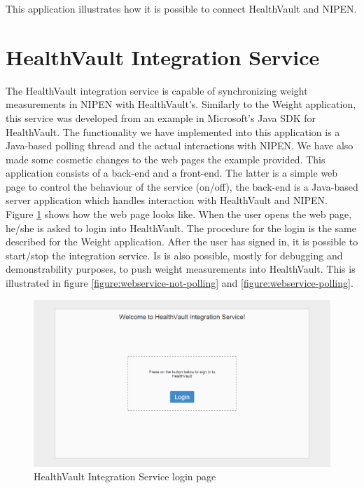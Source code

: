 This application illustrates how it is possible to connect HealthVault and NIPEN.

\section{HealthVault Integration Service}

The HealthVault integration service is capable of synchronizing weight measurements in NIPEN with HealthVault's.
Similarly to the Weight application, this service was developed from an example in Microsoft's Java SDK for HealthVault.
The functionality we have implemented into this application is a Java-based polling thread and the actual
interactions with NIPEN. We have also made some cosmetic changes to the web pages the example provided.
This application consists of a back-end and a front-end. The latter is a simple web page to control
the behaviour of the service (on/off), the back-end is a Java-based server application which handles
interaction with HealthVault and NIPEN.
Figure \ref{figure:webservice-login} shows how the web page looks like.
When the user opens the web page, he/she is asked to login into HealthVault.
The procedure for the login is the same described for the Weight application.
After the user has signed in, it is possible to start/stop the integration service.
Is is also possible, mostly for debugging and demonstrability purposes, to push weight measurements into HealthVault. 
This is illustrated in figure \ref{figure:webservice-not-polling} and \ref{figure:webservice-polling}.

\begin{figure}[H]
\centering
\includegraphics[scale=0.4]{../Figures/webservice-login.png}
\caption{HealthVault Integration Service login page}
\label{figure:webservice-login}
\end{figure}

